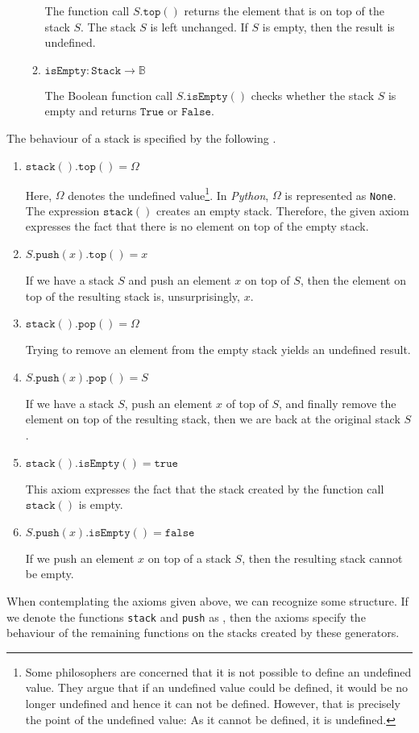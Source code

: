 \begin{enumerate}
\begin{enumerate}
            The function call $S.\texttt{top}()$ returns the element that is on top of the stack $S$. 
            The stack $S$ is left unchanged.  If $S$ is empty, then the result is undefined.
     \item $\texttt{isEmpty}: \texttt{Stack} \rightarrow \mathbb{B}$

           The Boolean function call $S.\texttt{isEmpty}()$ checks whether the stack $S$ is empty
           and returns $\texttt{True}$ or $\texttt{False}$.
      \end{enumerate}
\end{enumerate}
The behaviour of a stack is specified by the following .
\begin{enumerate}
\item $\texttt{stack}().\texttt{top}() = \Omega$

      Here, $\Omega$ \index{$\Omega$} denotes the undefined value\footnote{
       Some philosophers are concerned that it is not possible to define an undefined value.
       They argue that if an undefined value could be defined, it would be no longer undefined
       and hence it can not be defined.  However, that is precisely the point of the undefined 
       value: As it cannot be defined, it is undefined. }.
        
      In \textsl{Python}, $\Omega$ is represented as \texttt{None}. The expression $\texttt{stack}()$
      creates an empty stack.  Therefore, the given axiom expresses the fact that there is no
      element on top of the empty stack.
\item $S.\texttt{push}(x).\texttt{top}() = x$

      If we have a stack $S$ and push an element $x$ on top of $S$, then the element on top
      of the resulting stack is, unsurprisingly, $x$.
\item $\texttt{stack}().\texttt{pop}() = \Omega$

      Trying to remove an element from the empty stack yields an undefined result.
\item $S.\texttt{push}(x).\texttt{pop}() = S$

      If we have a stack $S$, push an element $x$ of top of $S$, and finally remove the element
      on top of the resulting stack, then we are back at the original stack $S$.
    
\item $\texttt{stack}().\texttt{isEmpty}() = \texttt{true}$

      This axiom expresses the fact that the stack created by the function call $\texttt{stack}()$
      is empty.
\item $S.\texttt{push}(x).\texttt{isEmpty}() = \texttt{false}$

      If we push an element $x$ on top of a stack $S$, then the resulting stack cannot be empty.
\end{enumerate}
When contemplating the axioms given above, we can recognize some structure.  If we denote the
functions \texttt{stack} and \texttt{push} as ,  then the axioms specify the
behaviour of the remaining functions on the stacks created by these generators.

